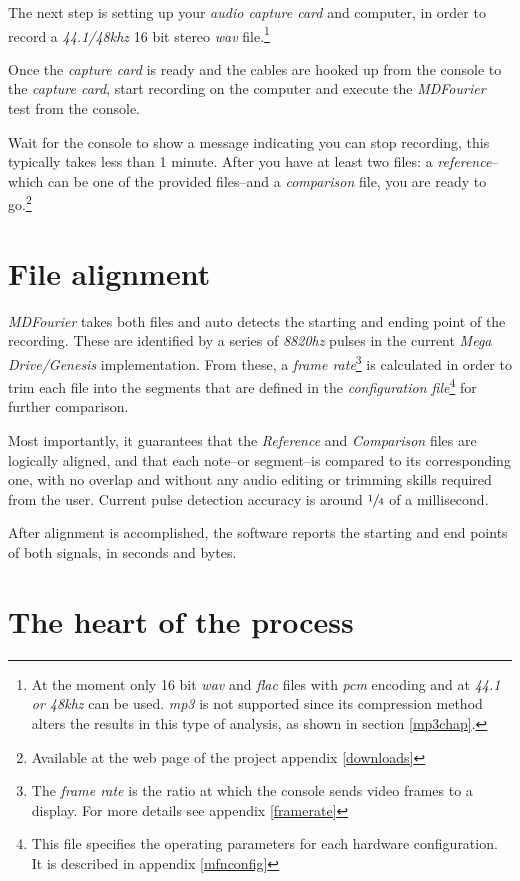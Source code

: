 \documentclass[10pt,a4paper]{report}
\newcommand{\ac}[1]{\textit{\acrshort{#1}}}
\newcommand{\hz}[1]{\textit{#1\acrshort{hz}}}
\newcommand{\khz}[1]{\textit{#1\acrshort{khz}}}
\begin{document}
The next step is setting up your \textit{audio capture card} and computer, in order to record a \khz{44.1/48} 16 bit stereo \ac{wav} file.\footnote{At the moment only 16 bit \ac{wav} and \ac{flac} files with \ac{pcm} encoding and at \khz{44.1 or 48} can be used.  \ac{mp3} is not supported since its compression method alters the results in this type of analysis, as shown in section \ref{mp3chap}.}

Once the \textit{capture card} is ready and the cables are hooked up from the console to the \textit{capture card}, start recording on the computer and execute the \textit{MDFourier} test from the console.

Wait for the console to show a message indicating you can stop recording, this typically takes less than 1 minute. After you have at least two files: a \textit{reference}--which can be one of the provided files--and a \textit{comparison} file, you are ready to go.\footnote{Available at the web page of the project appendix \ref{downloads}}

\section{File alignment}

\textit{MDFourier} takes both files and auto detects the starting and ending point of the recording. These are identified by a series of \hz{8820} pulses in the current \textit{Mega Drive/Genesis} implementation. From these, a \textit{frame rate}\footnote{The \textit{frame rate} is the ratio at which the console sends video frames to a display. For more details see appendix \ref{framerate}} is calculated in order to trim each file into the segments that are defined in the \textit{configuration file}\footnote{This file specifies the operating parameters for each hardware configuration. It is described in appendix \ref{mfnconfig}} for further comparison.

Most importantly, it guarantees that the \textit{Reference} and \textit{Comparison} files are logically aligned, and that each note--or segment--is compared to its corresponding one, with no overlap and without any audio editing or trimming skills required from the user. Current pulse detection accuracy is around $\sfrac{1}{4}$ of a millisecond.

After alignment is accomplished, the software reports the starting and end points of both signals, in seconds and bytes.

\section{The heart of the process}
\end{document}
